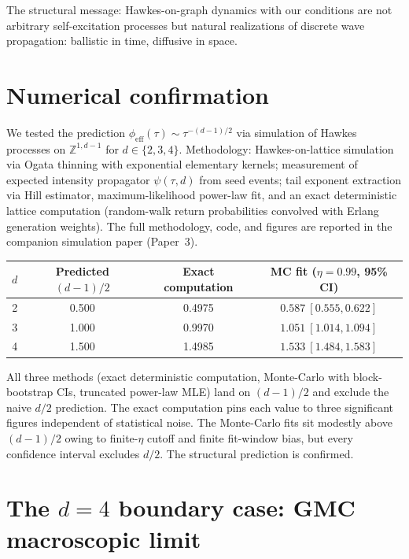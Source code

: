 \documentclass[11pt,a4paper]{article}
\begin{document}
The structural message: Hawkes-on-graph dynamics with our conditions are not arbitrary self-excitation processes but natural realizations of discrete wave propagation: ballistic in time, diffusive in space.

\section{Numerical confirmation}

We tested the prediction $\phi_{\mathrm{eff}}(\tau) \sim \tau^{-(d-1)/2}$ via simulation of Hawkes processes on $\mathbb{Z}^{1,d-1}$ for $d \in \{2, 3, 4\}$. Methodology: Hawkes-on-lattice simulation via Ogata thinning with exponential elementary kernels; measurement of expected intensity propagator $\psi(\tau, d)$ from seed events; tail exponent extraction via Hill estimator, maximum-likelihood power-law fit, and an exact deterministic lattice computation (random-walk return probabilities convolved with Erlang generation weights). The full methodology, code, and figures are reported in the companion simulation paper (Paper~3).

\begin{center}
\begin{tabular}{|c|c|c|c|}
\hline
$d$ & Predicted $(d-1)/2$ & Exact computation & MC fit ($\eta=0.99$, 95\% CI) \\
\hline
2 & 0.500 & 0.4975 & $0.587\ [0.555, 0.622]$ \\
3 & 1.000 & 0.9970 & $1.051\ [1.014, 1.094]$ \\
4 & 1.500 & 1.4985 & $1.533\ [1.484, 1.583]$ \\
\hline
\end{tabular}
\end{center}

All three methods (exact deterministic computation, Monte-Carlo with block-bootstrap CIs, truncated power-law MLE) land on $(d-1)/2$ and exclude the naive $d/2$ prediction. The exact computation pins each value to three significant figures independent of statistical noise. The Monte-Carlo fits sit modestly above $(d-1)/2$ owing to finite-$\eta$ cutoff and finite fit-window bias, but every confidence interval excludes $d/2$. The structural prediction is confirmed.

\section{The $d = 4$ boundary case: GMC macroscopic limit}
\end{document}
